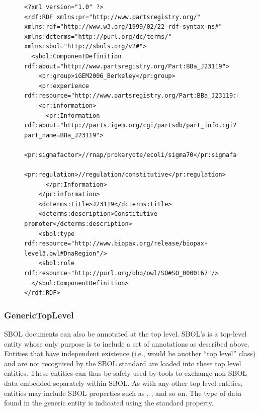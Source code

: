 \begin{figure} [ht]
\begin{lstlisting}
<?xml version="1.0" ?>
<rdf:RDF xmlns:pr="http://www.partsregistry.org/" xmlns:rdf="http://www.w3.org/1999/02/22-rdf-syntax-ns#" xmlns:dcterms="http://purl.org/dc/terms/" xmlns:sbol="http://sbols.org/v2#">
  <sbol:ComponentDefinition rdf:about="http://www.partsregistry.org/Part:BBa_J23119">
    <pr:group>iGEM2006_Berkeley</pr:group>
    <pr:experience rdf:resource="http://www.partsregistry.org/Part:BBa_J23119:Experience"/>
    <pr:information>
      <pr:Information rdf:about="http://parts.igem.org/cgi/partsdb/part_info.cgi?part_name=BBa_J23119">
        <pr:sigmafactor>//rnap/prokaryote/ecoli/sigma70</pr:sigmafactor>
        <pr:regulation>//regulation/constitutive</pr:regulation>
      </pr:Information>
    </pr:information>
    <dcterms:title>J23119</dcterms:title>
    <dcterms:description>Constitutive promoter</dcterms:description>
    <sbol:type rdf:resource="http://www.biopax.org/release/biopax-level3.owl#DnaRegion"/>
    <sbol:role rdf:resource="http://purl.org/obo/owl/SO#SO_0000167"/>
  </sbol:ComponentDefinition>
</rdf:RDF>
\end{lstlisting}
\label{ser:Annotation}
\end{figure}




\subsubsection{GenericTopLevel}  
\label{sec:GenericTopLevel}
SBOL documents can also be annotated at the top level. 
SBOL's  is a top-level entity whose only purpose is to include a set of annotations as described above. 
Entities that have independent existence (i.e., would be another ``top level'' class) and are not recognised by the SBOL standard are loaded into these top level entities. 
These  entities can thus be safely used by tools to exchange non-SBOL data embedded separately within SBOL.
As with any other top level entities,  entities may include SBOL properties such as , ,  and so on. The type of data found in the generic entity is indicated using the standard  property.

